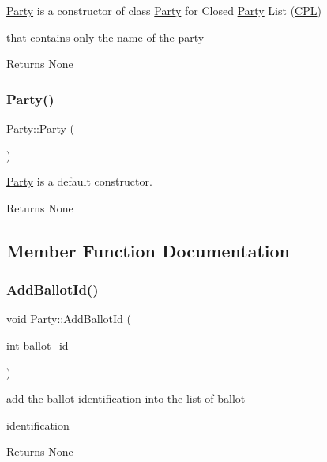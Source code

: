 \hyperlink{classParty}{Party} is a constructor of class \hyperlink{classParty}{Party} for Closed \hyperlink{classParty}{Party} List (\hyperlink{classCPL}{C\+PL}) 

that contains only the name of the party

\begin{DoxyReturn}{Returns}
None 
\end{DoxyReturn}
\mbox{\label{classParty_a31d77f763e1dc9549532653a4a0dfde5}} 
\subsubsection{\texorpdfstring{Party()}{Party()}\hspace{0.1cm}{\footnotesize\ttfamily [3/3]}}
{\footnotesize\ttfamily Party\+::\+Party (\begin{DoxyParamCaption}{ }\end{DoxyParamCaption})}



\hyperlink{classParty}{Party} is a default constructor. 

\begin{DoxyReturn}{Returns}
None 
\end{DoxyReturn}


\subsection{Member Function Documentation}
\mbox{\label{classParty_ad9dff61f9195359c440020ccebb4a5dd}} 
\subsubsection{\texorpdfstring{Add\+Ballot\+Id()}{AddBallotId()}}
{\footnotesize\ttfamily void Party\+::\+Add\+Ballot\+Id (\begin{DoxyParamCaption}\item[{int}]{ballot\+\_\+id }\end{DoxyParamCaption})}



add the ballot identification into the list of ballot 

identification

\begin{DoxyReturn}{Returns}
None 
\end{DoxyReturn}
\mbox{\label{classParty_a0ffe28b5f64b300dbe0d66356d8c6b1c}} 
